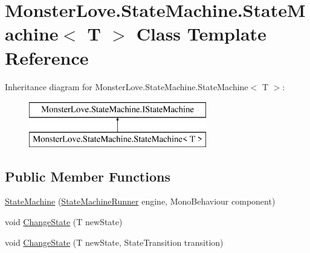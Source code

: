 \hypertarget{class_monster_love_1_1_state_machine_1_1_state_machine}{}\section{Monster\+Love.\+State\+Machine.\+State\+Machine$<$ T $>$ Class Template Reference}
\label{class_monster_love_1_1_state_machine_1_1_state_machine}


 


Inheritance diagram for Monster\+Love.\+State\+Machine.\+State\+Machine$<$ T $>$\+:\begin{figure}[H]
\begin{center}
\leavevmode
\includegraphics[height=2.000000cm]{class_monster_love_1_1_state_machine_1_1_state_machine}
\end{center}
\end{figure}
\subsection*{Public Member Functions}
\begin{DoxyCompactItemize}
\item 
\hyperlink{class_monster_love_1_1_state_machine_1_1_state_machine_a1c1fa13eb29ff5c43b54944ad74f09b5}{State\+Machine} (\hyperlink{class_monster_love_1_1_state_machine_1_1_state_machine_runner}{State\+Machine\+Runner} engine, Mono\+Behaviour component)
\item 
void \hyperlink{class_monster_love_1_1_state_machine_1_1_state_machine_a4c3fe2a0163ddeeeb7d20175e012add8}{Change\+State} (T new\+State)
\item 
void \hyperlink{class_monster_love_1_1_state_machine_1_1_state_machine_a7c0c6b5a0c4337fa9a35169c57ef0c0d}{Change\+State} (T new\+State, State\+Transition transition)
\end{DoxyCompactItemize}
